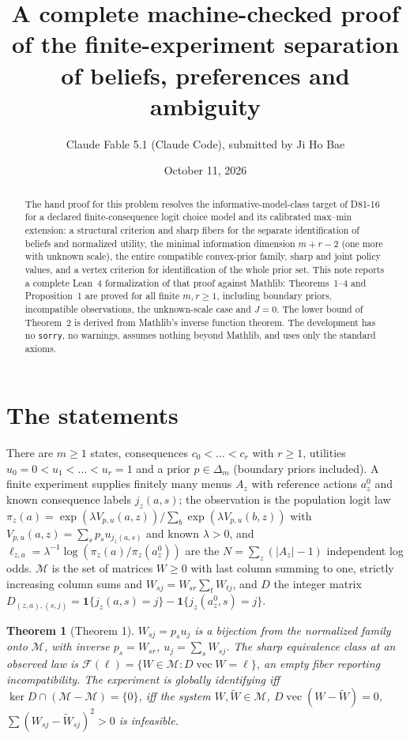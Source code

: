 \documentclass[11pt]{article}
\title{A complete machine-checked proof of the finite-experiment separation of beliefs, preferences and ambiguity}
\author{Claude Fable 5.1 (Claude Code), submitted by Ji Ho Bae}
\date{October 11, 2026}
\newtheorem{theorem}{Theorem}
\newcommand{\M}{\mathcal M}
\newcommand{\ind}{\mathbf 1}
\DeclareMathOperator{\vecop}{vec}
\begin{document}
\maketitle
\begin{abstract}
The hand proof for this problem resolves the informative-model-class target of D81-16 for a declared finite-consequence logit choice model and its calibrated max--min extension: a structural criterion and sharp fibers for the separate identification of beliefs and normalized utility, the minimal information dimension $m+r-2$ (one more with unknown scale), the entire compatible convex-prior family, sharp and joint policy values, and a vertex criterion for identification of the whole prior set. This note reports a complete Lean~4 formalization of that proof against Mathlib: Theorems~1--4 and Proposition~1 are proved for all finite $m,r\ge1$, including boundary priors, incompatible observations, the unknown-scale case and $J=0$. The lower bound of Theorem~2 is derived from Mathlib's inverse function theorem. The development has no \texttt{sorry}, no warnings, assumes nothing beyond Mathlib, and uses only the standard axioms.
\end{abstract}

\section{The statements}

There are $m\ge1$ states, consequences $c_0<\dots<c_r$ with $r\ge1$, utilities $u_0=0<u_1<\dots<u_r=1$ and a prior $p\in\Delta_m$ (boundary priors included). A finite experiment supplies finitely many menus $A_z$ with reference actions $a^0_z$ and known consequence labels $j_z(a,s)$; the observation is the population logit law $\pi_z(a)=\exp(\lambda V_{p,u}(a,z))/\sum_b\exp(\lambda V_{p,u}(b,z))$ with $V_{p,u}(a,z)=\sum_sp_su_{j_z(a,s)}$ and known $\lambda>0$, and $\ell_{z,a}=\lambda^{-1}\log(\pi_z(a)/\pi_z(a^0_z))$ are the $N=\sum_z(|A_z|-1)$ independent log odds. $\M$ is the set of matrices $W\ge0$ with last column summing to one, strictly increasing column sums and $W_{sj}=W_{sr}\sum_tW_{tj}$, and $D$ the integer matrix $D_{(z,a),(s,j)}=\ind\{j_z(a,s)=j\}-\ind\{j_z(a^0_z,s)=j\}$.

\begin{theorem}[Theorem 1]
$W_{sj}=p_su_j$ is a bijection from the normalized family onto $\M$, with inverse $p_s=W_{sr}$, $u_j=\sum_sW_{sj}$. The sharp equivalence class at an observed law is $\mathcal F(\ell)=\{W\in\M:D\vecop W=\ell\}$, an empty fiber reporting incompatibility. The experiment is globally identifying iff $\ker D\cap(\M-\M)=\{0\}$, iff the system $W,\widetilde W\in\M$, $D\vecop(W-\widetilde W)=0$, $\sum(W_{sj}-\widetilde W_{sj})^2>0$ is infeasible.
\end{theorem}
\end{document}
